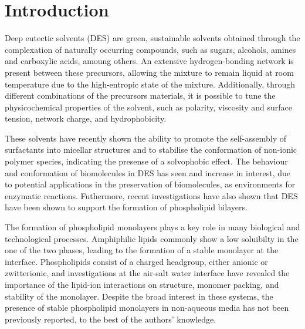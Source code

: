 \documentclass[twoside,twocolumn,9pt]{article}
\begin{document}
\section{Introduction}
Deep eutectic solvents (DES) are green, sustainable solvents obtained through the complexation of naturally occurring compounds, such as sugars, alcohols, amines and carboxylic acids, amoung others.\cite{Smith2014, Dai2013} An extensive hydrogen-bonding network is present between these precursors, allowing the mixture to remain liquid at room temperature due to the high-entropic state of the mixture.\cite{Hammond2016, Hammond2017, Araujo2017} Additionally, through different combinations of the precursors materials, it is possible to tune the physicochemical properties of the solvent, such as polarity,\cite{Pandey2014} viscosity and surface tension,\cite{Smith2014} network charge,\cite{Zahn2016} and hydrophobicity.\cite{Ribeiro2015,vanOsch2015} 

These solvents have recently shown the ability to promote the self-assembly of surfactants into micellar structures\cite{Sanchez-Fernandez2016,Arnold2015} and to stabilise the conformation of non-ionic polymer species,\cite{Sapir2016} indicating the presense of a solvophobic effect. The behaviour and conformation of biomolecules in DES has seen and increase in interest,\cite{Esquembre2013,Gorke2010,Gorke2008,Monhami2014,Wu2014,Harifi-Mood2017,Milano2017,Sanchez-Fernandez2017} due to potential applications in the preservation of biomolecules, as environments for enzymatic reactions.\cite{Merza2018} Futhermore, recent investigations have also shown that DES have been shown to support the formation of phospholipid bilayers.\cite{Bryant2017,Bryant2016,Gutierrez2009} 

The formation of phospholipid monolayers plays a key role in many biological and technological processes. Amphiphilic lipids commonly show a low soluibilty in the one of the two phases, leading to the formation of a stable monolayer at the interface.\cite{Mohwald1990} Phospholipids consist of a charged headgroup, either anionic or zwitterionic, and investigations at the air-salt water interface have revealed the importance of the lipid-ion interactions on structure, monomer packing, and stability of the monolayer.\cite{Mohwald1990,Kewalramani2010} Despite the broad interest in these systems, the presence of stable phospholipid monolayers in non-aqueous media has not been previously reported, to the best of the authors' knowledge. 
\end{document}
